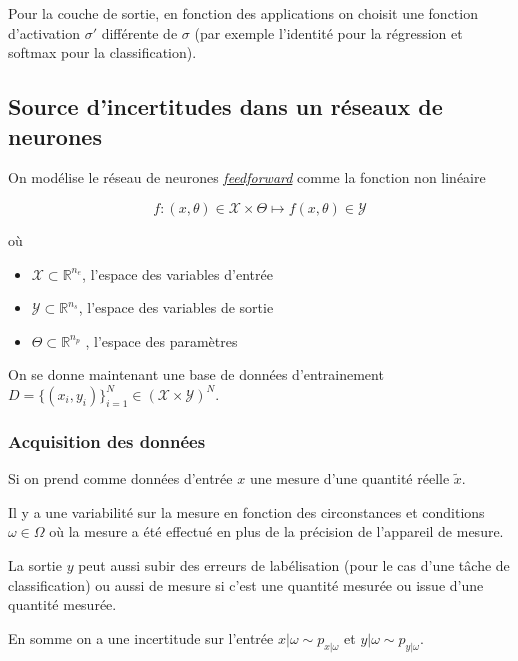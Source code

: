 \documentclass[french,12pt]{article}
\let\oldsubsection\subsection%
\renewcommand{\subsection}{%
  \renewcommand{\theequation}{\thesubsection.\arabic{equation}}%
  \oldsubsection}%
\begin{document}
Pour la couche de sortie, en fonction des applications on choisit une fonction d'activation $\sigma'$
différente de $\sigma$ (par exemple l'identité pour la régression et softmax pour la classification).

\subsection{Source d'incertitudes dans un réseaux de neurones}

On modélise le réseau de neurones \href{https://en.wikipedia.org/wiki/Feedforward_neural_network}{\textit{feedforward}} comme la fonction non linéaire

\begin{equation}
    f : (x, \theta) \in \mathcal{X} \times \Theta \mapsto f(x, \theta) \in \mathcal{Y}  
\end{equation}

où

\begin{itemize}
    \item $\mathcal{X} \subset \mathbb{R}^{n_e}$, l'espace des variables d'entrée
    \item $\mathcal{Y} \subset \mathbb{R}^{n_s}$, l'espace des variables de sortie
    \item $\Theta \subset \mathbb{R}^{n_p}$ , l'espace des paramètres
\end{itemize}

On se donne maintenant une base de données d'entrainement
$D = \{ (x_i, y_i)\}_{i = 1}^N \in (\mathcal{X} \times \mathcal{Y})^N$.

\subsubsection{Acquisition des données}

Si on prend comme données d'entrée $x$ une mesure d'une quantité réelle $\tilde{x}$.

Il y a une variabilité sur la mesure en fonction des circonstances
et conditions $\omega \in \Omega$ où la mesure a été effectué en
plus de la précision de l'appareil de mesure.

La sortie $y$ peut aussi subir des erreurs de labélisation
(pour le cas d'une tâche de classification) ou aussi de mesure si c'est
une quantité mesurée ou issue d'une quantité mesurée.

En somme on a une incertitude sur l'entrée $x | \omega \sim p_{x | \omega}$
et $y | \omega \sim p_{y | \omega}$.
\end{document}
